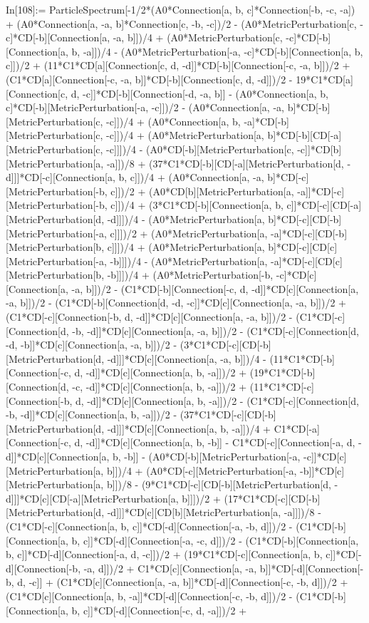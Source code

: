 In[108]:= ParticleSpectrum[-1/2*(A0*Connection[a, b, c]*Connection[-b, -c, -a]) + (A0*Connection[a, -a, b]*Connection[c, -b, -c])/2 - (A0*MetricPerturbation[c, -c]*CD[-b][Connection[a, -a, b]])/4 + (A0*MetricPerturbation[c, -c]*CD[-b][Connection[a, b, -a]])/4 - (A0*MetricPerturbation[-a, -c]*CD[-b][Connection[a, b, c]])/2 + (11*C1*CD[a][Connection[c, d, -d]]*CD[-b][Connection[-c, -a, b]])/2 + (C1*CD[a][Connection[-c, -a, b]]*CD[-b][Connection[c, d, -d]])/2 - 19*C1*CD[a][Connection[c, d, -c]]*CD[-b][Connection[-d, -a, b]] - (A0*Connection[a, b, c]*CD[-b][MetricPerturbation[-a, -c]])/2 - (A0*Connection[a, -a, b]*CD[-b][MetricPerturbation[c, -c]])/4 + (A0*Connection[a, b, -a]*CD[-b][MetricPerturbation[c, -c]])/4 + (A0*MetricPerturbation[a, b]*CD[-b][CD[-a][MetricPerturbation[c, -c]]])/4 - (A0*CD[-b][MetricPerturbation[c, -c]]*CD[b][MetricPerturbation[a, -a]])/8 + (37*C1*CD[-b][CD[-a][MetricPerturbation[d, -d]]]*CD[-c][Connection[a, b, c]])/4 + (A0*Connection[a, -a, b]*CD[-c][MetricPerturbation[-b, c]])/2 + (A0*CD[b][MetricPerturbation[a, -a]]*CD[-c][MetricPerturbation[-b, c]])/4 + (3*C1*CD[-b][Connection[a, b, c]]*CD[-c][CD[-a][MetricPerturbation[d, -d]]])/4 - (A0*MetricPerturbation[a, b]*CD[-c][CD[-b][MetricPerturbation[-a, c]]])/2 + (A0*MetricPerturbation[a, -a]*CD[-c][CD[-b][MetricPerturbation[b, c]]])/4 + (A0*MetricPerturbation[a, b]*CD[-c][CD[c][MetricPerturbation[-a, -b]]])/4 - (A0*MetricPerturbation[a, -a]*CD[-c][CD[c][MetricPerturbation[b, -b]]])/4 + (A0*MetricPerturbation[-b, -c]*CD[c][Connection[a, -a, b]])/2 - (C1*CD[-b][Connection[-c, d, -d]]*CD[c][Connection[a, -a, b]])/2 - (C1*CD[-b][Connection[d, -d, -c]]*CD[c][Connection[a, -a, b]])/2 + (C1*CD[-c][Connection[-b, d, -d]]*CD[c][Connection[a, -a, b]])/2 - (C1*CD[-c][Connection[d, -b, -d]]*CD[c][Connection[a, -a, b]])/2 - (C1*CD[-c][Connection[d, -d, -b]]*CD[c][Connection[a, -a, b]])/2 - (3*C1*CD[-c][CD[-b][MetricPerturbation[d, -d]]]*CD[c][Connection[a, -a, b]])/4 - (11*C1*CD[-b][Connection[-c, d, -d]]*CD[c][Connection[a, b, -a]])/2 + (19*C1*CD[-b][Connection[d, -c, -d]]*CD[c][Connection[a, b, -a]])/2 + (11*C1*CD[-c][Connection[-b, d, -d]]*CD[c][Connection[a, b, -a]])/2 - (C1*CD[-c][Connection[d, -b, -d]]*CD[c][Connection[a, b, -a]])/2 - (37*C1*CD[-c][CD[-b][MetricPerturbation[d, -d]]]*CD[c][Connection[a, b, -a]])/4 + C1*CD[-a][Connection[-c, d, -d]]*CD[c][Connection[a, b, -b]] - C1*CD[-c][Connection[-a, d, -d]]*CD[c][Connection[a, b, -b]] - (A0*CD[-b][MetricPerturbation[-a, -c]]*CD[c][MetricPerturbation[a, b]])/4 + (A0*CD[-c][MetricPerturbation[-a, -b]]*CD[c][MetricPerturbation[a, b]])/8 - (9*C1*CD[-c][CD[-b][MetricPerturbation[d, -d]]]*CD[c][CD[-a][MetricPerturbation[a, b]]])/2 + (17*C1*CD[-c][CD[-b][MetricPerturbation[d, -d]]]*CD[c][CD[b][MetricPerturbation[a, -a]]])/8 - (C1*CD[-c][Connection[a, b, c]]*CD[-d][Connection[-a, -b, d]])/2 - (C1*CD[-b][Connection[a, b, c]]*CD[-d][Connection[-a, -c, d]])/2 - (C1*CD[-b][Connection[a, b, c]]*CD[-d][Connection[-a, d, -c]])/2 + (19*C1*CD[-c][Connection[a, b, c]]*CD[-d][Connection[-b, -a, d]])/2 + C1*CD[c][Connection[a, -a, b]]*CD[-d][Connection[-b, d, -c]] + (C1*CD[c][Connection[a, -a, b]]*CD[-d][Connection[-c, -b, d]])/2 + (C1*CD[c][Connection[a, b, -a]]*CD[-d][Connection[-c, -b, d]])/2 - (C1*CD[-b][Connection[a, b, c]]*CD[-d][Connection[-c, d, -a]])/2 + 